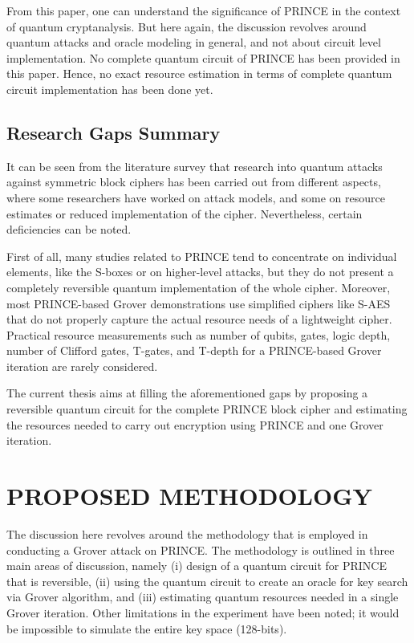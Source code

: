 \documentclass[12pt,a4paper]{report}
\begin{document}
From this paper, one can understand the significance of PRINCE in the context of quantum cryptanalysis. But here again, the discussion revolves around quantum attacks and oracle modeling in general, and not about circuit level implementation. No complete quantum circuit of PRINCE has been provided in this paper. Hence, no exact resource estimation in terms of complete quantum circuit implementation has been done yet.

\section{Research Gaps Summary}

It can be seen from the literature survey that research into quantum attacks against symmetric block ciphers has been carried out from different aspects, where some researchers have worked on attack models, and some on resource estimates or reduced implementation of the cipher. Nevertheless, certain deficiencies can be noted.

First of all, many studies related to PRINCE tend to concentrate on individual elements, like the S-boxes or on higher-level attacks, but they do not present a completely reversible quantum implementation of the whole cipher. Moreover, most PRINCE-based Grover demonstrations use simplified ciphers like S-AES that do not properly capture the actual resource needs of a lightweight cipher. Practical resource measurements such as number of qubits, gates, logic depth, number of Clifford gates, T-gates, and T-depth for a PRINCE-based Grover iteration are rarely considered.

The current thesis aims at filling the aforementioned gaps by proposing a reversible quantum circuit for the complete PRINCE block cipher and estimating the resources needed to carry out encryption using PRINCE and one Grover iteration.

\chapter{PROPOSED METHODOLOGY}

The discussion here revolves around the methodology that is employed in conducting a Grover attack on PRINCE. The methodology is outlined in three main areas of discussion, namely (i) design of a quantum circuit for PRINCE that is reversible, (ii) using the quantum circuit to create an oracle for key search via Grover algorithm, and (iii) estimating quantum resources needed in a single Grover iteration. Other limitations in the experiment have been noted; it would be impossible to simulate the entire key space (128-bits).
\end{document}
